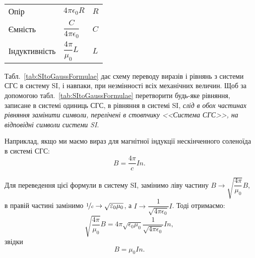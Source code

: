 \begin{table}[h!]
\begin{tabular}{M{7.5cm}ll}
		Опір                                                       & $4\pi\epsilon_0 R$                                                             & $R$                                       \\
		Ємність                                                    & $\dfrac{C}{4\pi\epsilon_0}$                                                  & $C$                                       \\
		Індуктивність                                              & $\dfrac{4\pi}{\mu_0} L$                                                           & $L$                                       \\ \bottomrule
	\end{tabular}
\end{table}
Табл.~\ref{tab:SItoGaussFormulae} дає схему переводу виразів і рівнянь з системи СГС в систему SI, і навпаки, при незмінності всіх механічних величин. Щоб за допомогою табл.~\ref{tab:SItoGaussFormulae} перетворити будь-яке рівняння, записане в системі одиниць СГС, в рівняння в системі SI, \emph{слід в обох частинах рівняння замінити символи, перелічені в стовпчику <<Система СГС>>, на відповідні символи системи SI}.

Наприклад, якщо ми маємо вираз для магнітної індукції нескінченного соленоїда в системі СГС:
\[
	B = \frac{4\pi}{c} I n.
\]

Для переведення цієї формули в систему SI, замінимо ліву частину $B \to \sqrt{\dfrac{4\pi}{\mu_0}} B$, в правій частині замінимо $\nicefrac{1}{c} \to \sqrt{\varepsilon_0\mu_0} $, а $I \to \dfrac{1}{\sqrt{4\pi\epsilon_0}} I$. Тоді отримаємо:
\[
	\sqrt{\dfrac{4\pi}{\mu_0}} B = 4\pi\sqrt{\epsilon_0\mu_0} \frac{1}{\sqrt{4\pi\epsilon_0}} I n,
\]
звідки
\[
	B = \mu_0 I n.
\]



